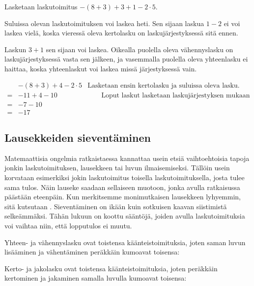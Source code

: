 \begin{esimerkki}
Lasketaan laskutoimitus $-(8+3)+3+1-2\cdot 5$.

Suluissa olevan laskutoimituksen voi laskea heti. Sen sijaan laskua $1-2$ ei voi laskea vielä,
koska vieressä oleva kertolasku on laskujärjestyksessä sitä ennen. %

Laskun $3+1$ sen sijaan voi laskea. Oikealla puolella oleva vähennyslasku on
laskujärjestyksessä vasta sen jälkeen, ja vasemmalla puolella oleva yhteenlasku ei haittaa,
koska yhteenlaskut voi laskea missä järjestyksessä vain.

\begin{align*}
   &-(8+3)+4-2\cdot 5&\textrm{Lasketaan ensin kertolasku ja suluissa oleva lasku.}
\\=&-11+4-10&\qquad\textrm{Loput laskut lasketaan laskujärjestyksen mukaan vasemmalta oikealle.}
\\=&-7-10&
\\=&-17&
\end{align*}
\end{esimerkki}

\subsection*{Lausekkeiden sieventäminen}

Matemaattisia ongelmia ratkaistaessa kannattaa usein etsiä vaihtoehtoisia tapoja jonkin laskutoimituksen, lausekkeen tai luvun ilmaisemiseksi. Tällöin usein korvataan esimerkiksi jokin laskutoimitus toisella laskutoimituksella, josta tulee sama tulos. Näin lauseke saadaan sellaiseen muotoon, jonka avulla ratkaisussa päästään eteenpäin. Kun merkitsemme monimutkaisen lausekkeen lyhyemmin, sitä kutsutaan . Sieventäminen on ikään kuin sotkuisen kaavan siistimistä selkeämmäksi.
Tähän lukuun on koottu sääntöjä, joiden avulla laskutoimituksia voi vaihtaa niin, että lopputulos ei muutu.

Yhteen- ja vähennyslasku ovat toistensa käänteistoimituksia, joten saman luvun lisääminen ja vähentäminen peräkkäin kumoavat toisensa:


Kerto- ja jakolasku ovat toistensa käänteistoimituksia, joten peräkkäin kertominen ja jakaminen samalla luvulla kumoavat toisensa:

